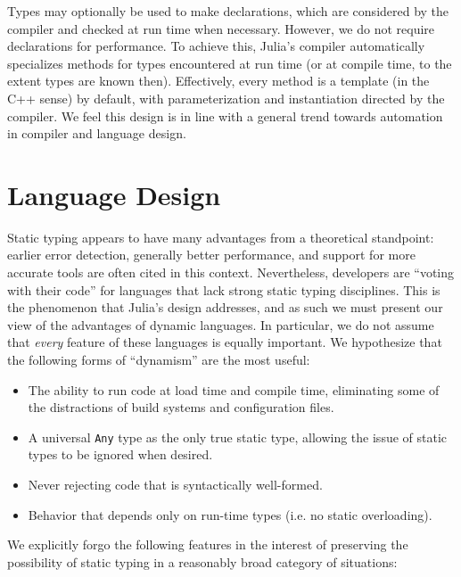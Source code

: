\documentclass[9pt]{sigplanconf}
\begin{document}
Types may optionally be used to make declarations, which are considered by
the compiler and checked at run time when necessary. However, we do not
require declarations for performance. To achieve this, Julia's compiler
automatically specializes methods for types encountered at run time
(or at compile time, to the extent types are known then). Effectively,
every method is a template (in the C++ sense) by default, with
parameterization and instantiation directed by the compiler. We feel this
design is in line with a general trend towards automation in compiler
and language design.


\section{Language Design}


Static typing appears to have many advantages from a theoretical
standpoint: earlier error detection, generally better performance, and
support for more accurate tools are often cited in this context.
Nevertheless, developers are ``voting with their code'' for languages that
lack strong static typing disciplines. This is the phenomenon that Julia's
design addresses, and as such we must present our view of the advantages of
dynamic languages. In particular, we do not assume that \emph{every}
feature of these languages is equally important.
We hypothesize that the following forms of ``dynamism'' are
the most useful:

\begin{itemize}
\item The ability to run code at load time and compile time, eliminating
some of the distractions of build systems and configuration files.
\item A universal {\tt Any} type as the only true static type,
allowing the issue of static types to be ignored when desired.
\item Never rejecting code that is syntactically well-formed.
\item Behavior that depends only on run-time types (i.e. no static overloading).
\end{itemize}

We explicitly forgo the following features in the interest of preserving
the possibility of static typing in a reasonably broad category of
situations:
\end{document}
